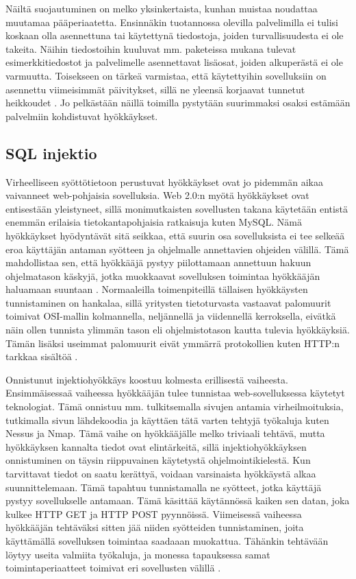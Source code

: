 Näiltä suojautuminen on melko yksinkertaista, kunhan muistaa noudattaa muutamaa pääperiaatetta. Ensinnäkin tuotannossa 
olevilla palvelimilla ei tulisi koskaan olla asennettuna tai käytettynä tiedostoja, joiden turvallisuudesta ei ole
takeita. Näihin tiedostoihin kuuluvat mm. paketeissa mukana tulevat esimerkkitiedostot ja palvelimelle asennettavat 
lisäosat, joiden alkuperästä ei ole varmuutta. Toisekseen on tärkeä varmistaa, että käytettyihin sovelluksiin
on asennettu viimeisimmät päivitykset, sillä ne yleensä korjaavat tunnetut heikkoudet \cite{Hacking}. Jo pelkästään näillä 
toimilla pystytään suurimmaksi osaksi estämään palvelmiin kohdistuvat hyökkäykset. 

\subsection{SQL injektio}

Virheelliseen syöttötietoon perustuvat hyökkäykset ovat jo pidemmän aikaa vaivanneet web-pohjaisia sovelluksia.
Web 2.0:n myötä hyökkäykset ovat entisestään yleistyneet, sillä monimutkaisten sovellusten takana käytetään entistä
enemmän erilaisia tietokantapohjaisia ratkaisuja kuten MySQL. Nämä hyökkäykset hyödyntävät sitä seikkaa, että suurin osa
sovelluksista ei tee selkeää eroa käyttäjän antaman syötteen ja ohjelmalle annettavien ohjeiden välillä. Tämä mahdollistaa
sen, että hyökkääjä pystyy piilottamaan annettuun hakuun ohjelmatason käskyjä, jotka muokkaavat sovelluksen toimintaa
hyökkääjän haluamaan suuntaan \cite{WEB2}. Normaaleilla toimenpiteillä tällaisen hyökkäysten tunnistaminen on hankalaa, sillä
yritysten tietoturvasta vastaavat palomuurit toimivat OSI-mallin kolmannella, neljännellä ja viidennellä kerroksella, eivätkä
näin ollen tunnista ylimmän tason eli ohjelmistotason kautta tulevia hyökkäyksiä. Tämän lisäksi useimmat palomuurit eivät ymmärrä protokollien
kuten HTTP:n tarkkaa sisältöä \cite{SQLSS}.

Onnistunut injektiohyökkäys koostuu kolmesta erillisestä vaiheesta. Ensimmäisessaä vaiheessa hyökkääjän tulee tunnistaa 
web-sovelluksessa käytetyt teknologiat. Tämä onnistuu mm. tulkitsemalla sivujen antamia virheilmoituksia, tutkimalla 
sivun lähdekoodia ja käyttäen tätä varten tehtyjä työkaluja kuten Nessus ja Nmap. Tämä vaihe on hyökkääjälle melko triviaali
tehtävä, mutta hyökkäyksen kannalta tiedot ovat elintärkeitä, sillä injektiohyökkäyksen onnistuminen on täysin riippuvainen 
käytetystä ohjelmointikielestä. Kun tarvittavat tiedot on saatu kerättyä, voidaan varsinaista hyökkäystä alkaa suunnittelemaan.
Tämä tapahtuu tunnistamalla ne syötteet, jotka käyttäjä pystyy sovellukselle antamaan. Tämä käsittää käytännössä kaiken sen 
datan, joka kulkee HTTP GET ja HTTP POST pyynnöissä. Viimeisessä vaiheessa hyökkääjän tehtäväksi sitten jää niiden syötteiden 
tunnistaminen, joita käyttämällä sovelluksen toimintaa saadaaan muokattua. Tähänkin tehtävään löytyy useita valmiita työkaluja, ja
monessa tapauksessa samat toimintaperiaatteet toimivat eri sovellusten välillä \cite{WEB2}.

